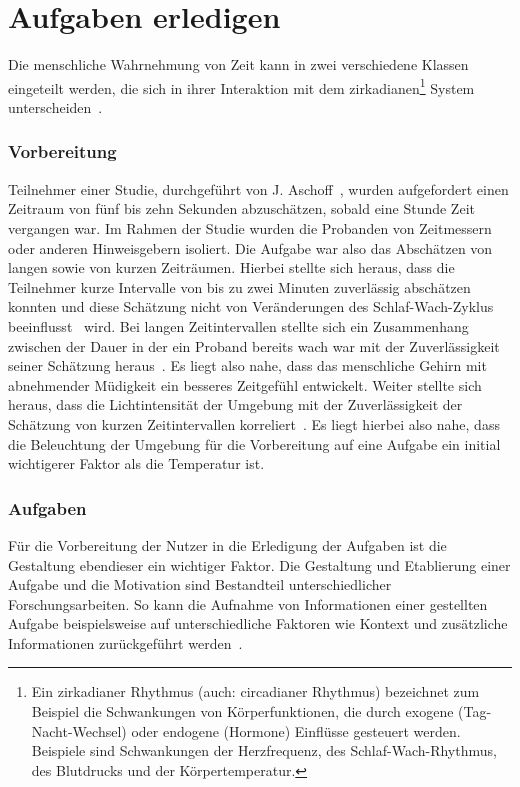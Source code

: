 \section{Aufgaben erledigen}\label{sec:relatedWork.aufgaben}

Die menschliche Wahrnehmung von Zeit kann in zwei verschiedene Klassen eingeteilt werden, die sich in ihrer Interaktion mit dem zirkadianen\footnote{Ein zirkadianer Rhythmus (auch: circadianer Rhythmus) bezeichnet zum Beispiel die Schwankungen von Körperfunktionen, die durch exogene (Tag-Nacht-Wechsel) oder endogene (Hormone) Einflüsse gesteuert werden. Beispiele sind Schwankungen der Herzfrequenz, des Schlaf-Wach-Rhythmus, des Blutdrucks und der Körpertemperatur.} System unterscheiden~\cite{aschoff1998human, aschoff1985perception}.

\subsubsection{Vorbereitung}

Teilnehmer einer Studie, durchgeführt von J. Aschoff~\cite{aschoff1998human}, wurden aufgefordert einen Zeitraum von fünf bis zehn Sekunden abzuschätzen, sobald eine Stunde Zeit vergangen war. Im Rahmen der Studie wurden die Probanden von Zeitmessern oder anderen Hinweisgebern isoliert.
Die Aufgabe war also das Abschätzen von langen sowie von kurzen Zeiträumen. 
Hierbei stellte sich heraus, dass die Teilnehmer kurze Intervalle von bis zu zwei Minuten zuverlässig abschätzen konnten und diese Schätzung nicht von Veränderungen des Schlaf-Wach-Zyklus beeinflusst~\cite{aschoff1998human} wird. 
Bei langen Zeitintervallen stellte sich ein Zusammenhang zwischen der Dauer in der ein Proband bereits wach war mit der Zuverlässigkeit seiner Schätzung heraus~\cite{aschoff1998human}. 
Es liegt also nahe, dass das menschliche Gehirn mit abnehmender Müdigkeit ein besseres Zeitgefühl entwickelt.
Weiter stellte sich heraus, dass die Lichtintensität der Umgebung mit der Zuverlässigkeit der Schätzung von kurzen Zeitintervallen korreliert~\cite{aschoff1998human}.
Es liegt hierbei also nahe, dass die Beleuchtung der Umgebung für die Vorbereitung auf eine Aufgabe ein initial wichtigerer Faktor als die Temperatur ist. 

\subsubsection{Aufgaben}

Für die Vorbereitung der Nutzer in die Erledigung der Aufgaben ist die Gestaltung ebendieser ein wichtiger Faktor. Die Gestaltung und Etablierung einer Aufgabe und die Motivation sind Bestandteil unterschiedlicher Forschungsarbeiten. 
So kann die Aufnahme von Informationen einer gestellten Aufgabe beispielsweise auf unterschiedliche Faktoren wie Kontext und zusätzliche Informationen zurückgeführt werden~\cite{salancik1978social, van2002blueprints, hollnagel2003handbook}. 

